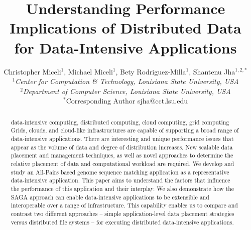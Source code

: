 \documentclass{rspublic}
\title[Understanding Performance Implications of Distributed Data for
Data-Intensive Applications]{Understanding Performance Implications of
Distributed Data for Data-Intensive Applications}
\author[Miceli, Miceli, Rodriguez-Milla, Jha]{ Christopher Miceli$^{1}$,
Michael Miceli$^{1}$, Bety Rodriguez-Milla$^{1}$, Shantenu Jha$^{1,2,*}$ \\
\small{\emph{$^{1}$Center for Computation \& Technology, Louisiana State
University, USA}} \\  \small{\emph{$^{2}$Department of Computer Science,
Louisiana State University, USA}} \\ {\footnotesize {\hspace{0.0 in}
$^*$Corresponding Author sjha@cct.lsu.edu}} }
\begin{document}
 \maketitle

\begin{abstract}{data-intensive computing, distributed computing,
cloud computing, grid computing} 
Grids, clouds, and cloud-like infrastructures are capable of supporting
a broad range of data-intensive applications. There are interesting
and unique performance issues that appear as the volume of data and
degree of distribution increases. New scalable data placement and
management techniques, as well as novel approaches to determine the
relative placement of data and computational workload are required. We
develop and study an All-Pairs based genome sequence matching
application as a representative data-intensive application.  This paper
aims to understand the factors that influence the performance of this
application and their interplay.  %
We also demonstrate how the SAGA approach can enable data-intensive
applications to be extensible and interoperable over a range of
infrastructure. This capability enables us to compare and contrast two
different approaches -- simple application-level data placement
strategies versus distributed file systems -- for executing distributed
data-intensive applications.

\end{abstract}
\end{document}
